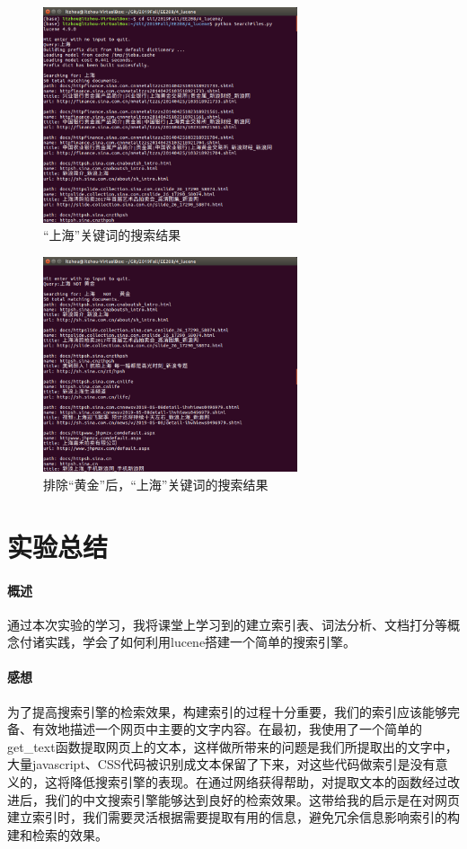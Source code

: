 \documentclass{article}
\begin{document}
\begin{figure}[htbp]
\centering
\includegraphics[width=7.5cm]{img/test2.png}
\caption{“上海”关键词的搜索结果}
\label{fig:test2}
\end{figure}

\begin{figure}[htbp]
\centering
\includegraphics[width=7.5cm]{img/test3.png}
\caption{排除“黄金”后，“上海”关键词的搜索结果}
\label{fig:test3}
\end{figure}


\section{实验总结}
\paragraph{概述}
通过本次实验的学习，我将课堂上学习到的建立索引表、词法分析、文档打分等概念付诸实践，学会了如何利用lucene搭建一个简单的搜索引擎。

\paragraph{感想}
为了提高搜索引擎的检索效果，构建索引的过程十分重要，我们的索引应该能够完备、有效地描述一个网页中主要的文字内容。在最初，我使用了一个简单的get\_text函数提取网页上的文本，这样做所带来的问题是我们所提取出的文字中，大量javascript、CSS代码被识别成文本保留了下来，对这些代码做索引是没有意义的，这将降低搜索引擎的表现。在通过网络获得帮助，对提取文本的函数经过改进后，我们的中文搜索引擎能够达到良好的检索效果。这带给我的启示是在对网页建立索引时，我们需要灵活根据需要提取有用的信息，避免冗余信息影响索引的构建和检索的效果。
\end{document}

